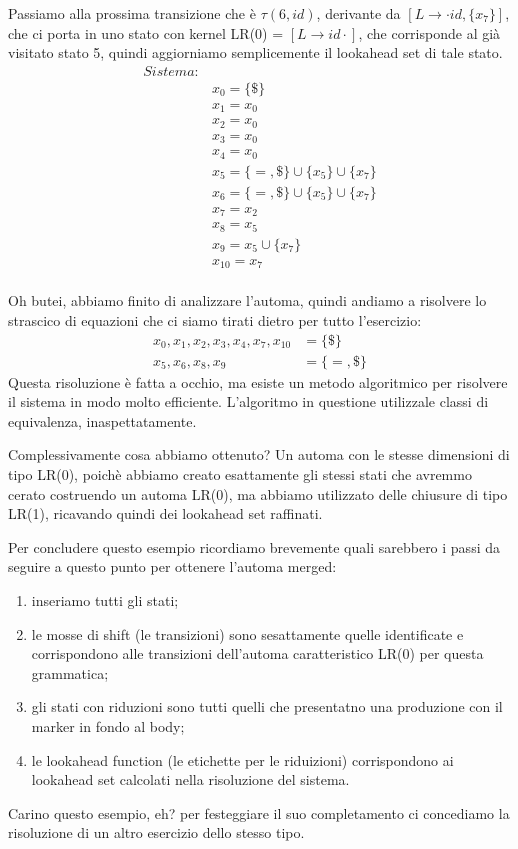 \documentclass[class=book, crop=false, oneside, 12pt]{standalone}
\begin{document}
Passiamo alla prossima transizione che è \(\tau(6, id)\), derivante da \([L \to \cdot id, \{x_7\}]\), che ci porta in uno stato con kernel LR(0) = \([L \to id \cdot]\), che corrisponde al già visitato stato 5, quindi aggiorniamo semplicemente il lookahead set di tale stato.
\begin{align*}
    Sistema:& \\
            & x_0 = \{\$\} \\
            & x_1 = x_0 \\
            & x_2 = x_0 \\
            & x_3 = x_0 \\
            & x_4 = x_0 \\
            & x_5 = \{=, \$\} \cup \{x_5\} \cup \{x_7\} \\
            & x_6 = \{=, \$\} \cup \{x_5\} \cup \{x_7\} \\
            & x_7 = x_2 \\
            & x_8 = x_5 \\
            & x_9 = x_5 \cup \{x_7\} \\
            & x_{10} = x_7 \\
\end{align*}

Oh butei, abbiamo finito di analizzare l'automa, quindi andiamo a risolvere lo strascico di equazioni che ci siamo tirati dietro per tutto l'esercizio:
\begin{align*}
    x_0, x_1, x_2, x_3, x_4, x_7, x_{10} &= \{\$\} \\
    x_5, x_6, x_8, x_9 &= \{=, \$\}
\end{align*}
Questa risoluzione è fatta a occhio, ma esiste un metodo algoritmico per risolvere il sistema in modo molto efficiente.
L'algoritmo in questione utilizzale classi di equivalenza, inaspettatamente.

Complessivamente cosa abbiamo ottenuto?
Un automa con le stesse dimensioni di tipo LR(0), poichè abbiamo creato esattamente gli stessi stati che avremmo cerato costruendo un automa LR(0), ma abbiamo utilizzato delle chiusure di tipo LR(1), ricavando quindi dei lookahead set raffinati.

Per concludere questo esempio ricordiamo brevemente quali sarebbero i passi da seguire a questo punto per ottenere l'automa merged:
\begin{enumerate}
    \item inseriamo tutti gli stati;
    \item le mosse di shift (le transizioni) sono sesattamente quelle identificate e corrispondono alle transizioni dell'automa caratteristico LR(0) per questa grammatica;
    \item gli stati con riduzioni sono tutti quelli che presentatno una produzione con il marker in fondo al body;
    \item le lookahead function (le etichette per le riduizioni) corrispondono ai lookahead set calcolati nella risoluzione del sistema.
\end{enumerate}
Carino questo esempio, eh? per festeggiare il suo completamento ci concediamo la risoluzione di un altro esercizio dello stesso tipo.
\end{document}
